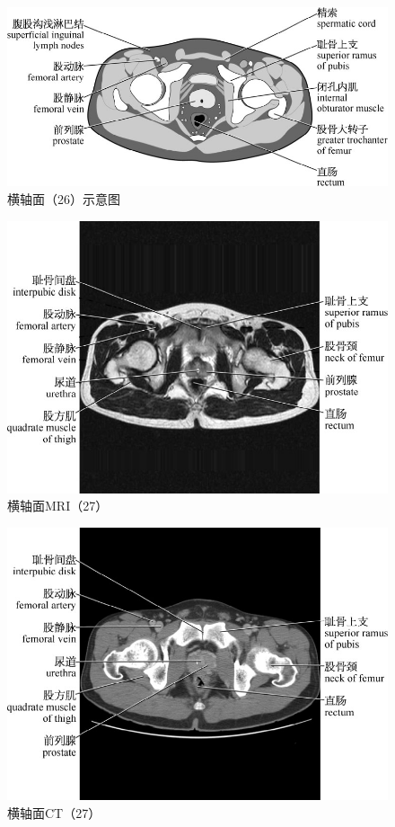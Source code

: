\begin{figure}[!htbp]
 \centering
 \includegraphics{./images/Image00079.jpg}
 \captionsetup{justification=centering}
 \caption{横轴面（26）示意图}
  \end{figure} 
 \FloatBarrier

\begin{figure}[!htbp]
 \centering
 \includegraphics{./images/Image00080.jpg}
 \captionsetup{justification=centering}
 \caption{横轴面MRI（27）}
  \end{figure} 
 \FloatBarrier

\begin{figure}[!htbp]
 \centering
 \includegraphics{./images/Image00081.jpg}
 \captionsetup{justification=centering}
 \caption{横轴面CT（27）}
  \end{figure} 
 \FloatBarrier

